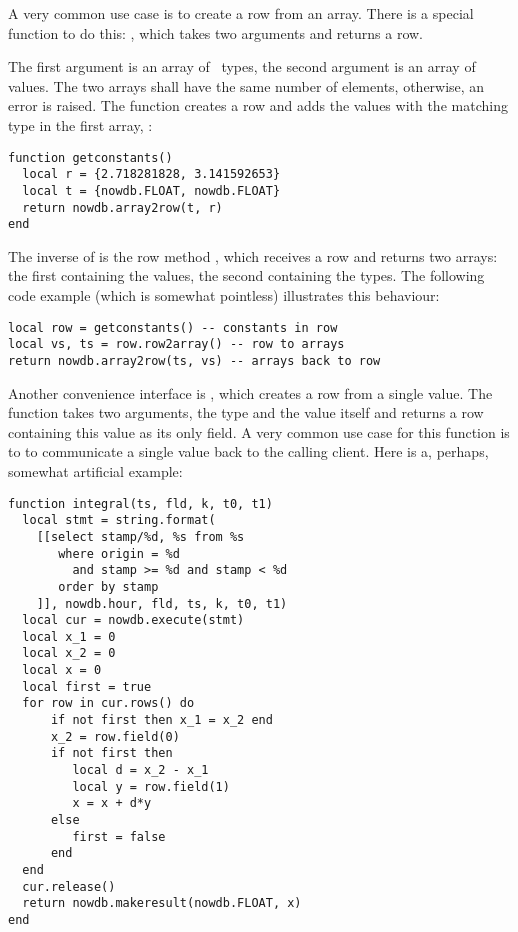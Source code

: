 A very common use case is to create a row from
an array. There is a special function to do this:
, which takes two arguments
and returns a row.

The first argument is an array of \nowdb\ types,
the second argument is an array of values.
The two arrays shall have the same number
of elements, otherwise, an error is raised.
The function creates a row and adds the values
with the matching type in the first array, \eg:

\begin{lua}
\begin{lstlisting}
function getconstants()
  local r = {2.718281828, 3.141592653}
  local t = {nowdb.FLOAT, nowdb.FLOAT}
  return nowdb.array2row(t, r)
end
\end{lstlisting}
\end{lua}

The inverse of  is the row method
, which receives a row and returns
two arrays: the first containing the values,
the second containing the types.
The following code example (which is
somewhat pointless) illustrates this
behaviour:

\begin{lua}
\begin{lstlisting}
local row = getconstants() -- constants in row
local vs, ts = row.row2array() -- row to arrays
return nowdb.array2row(ts, vs) -- arrays back to row
\end{lstlisting}
\end{lua}

Another convenience interface is ,
which creates a row from a single value. The function
takes two arguments, the type and the value itself
and returns a row containing this value as its
only field. A very common use case for this function is to
to communicate a single value back to the calling client.
Here is a, perhaps, somewhat artificial example:

\begin{lua}
\begin{lstlisting}
function integral(ts, fld, k, t0, t1)
  local stmt = string.format(
    [[select stamp/%d, %s from %s
       where origin = %d
         and stamp >= %d and stamp < %d
       order by stamp
    ]], nowdb.hour, fld, ts, k, t0, t1)
  local cur = nowdb.execute(stmt)
  local x_1 = 0
  local x_2 = 0
  local x = 0
  local first = true
  for row in cur.rows() do
      if not first then x_1 = x_2 end
      x_2 = row.field(0)
      if not first then
         local d = x_2 - x_1
         local y = row.field(1)
         x = x + d*y
      else
         first = false
      end
  end
  cur.release()
  return nowdb.makeresult(nowdb.FLOAT, x)
end
\end{lstlisting}
\end{lua}


